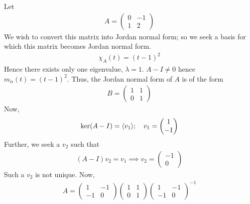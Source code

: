 \begin{example}
	Let
	\begin{align*}
		A = \begin{pmatrix}
			0 & -1 \\
			1 & 2
		\end{pmatrix}
	\end{align*}
	We wish to convert this matrix into Jordan normal form; so we seek a basis for which this matrix becomes Jordan normal form.
	\begin{align*}
		\chi_A(t) = (t-1)^2
	\end{align*}
	Hence there exists only one eigenvalue, $\lambda = 1$.
	$A - I \neq 0$ hence $m_\alpha(t) = (t-1)^2$.
	Thus, the Jordan normal form of $A$ is of the form
	\begin{align*}
		B = \begin{pmatrix}
			1 & 1 \\
			0 & 1
		\end{pmatrix}
	\end{align*}
	Now,
	\begin{align*}
		\ker(A - I) = \langle{} v_1 \rangle;\quad v_1 = \begin{pmatrix}
			1 \\ -1
		\end{pmatrix}
	\end{align*}
	Further, we seek a $v_2$ such that
	\begin{align*}
		(A - I)v_2 = v_1 \implies v_2 = \begin{pmatrix}
			-1 \\ 0
		\end{pmatrix}
	\end{align*}
	Such a $v_2$ is not unique.
	Now,
	\begin{align*}
		A = \begin{pmatrix}
			1  & -1 \\
			-1 & 0
		\end{pmatrix}
		\begin{pmatrix}
			1 & 1 \\
			0 & 1
		\end{pmatrix}
		\begin{pmatrix}
			1  & -1 \\
			-1 & 0
		\end{pmatrix}^{-1}
	\end{align*}
\end{example}